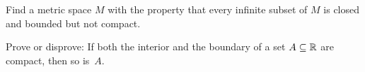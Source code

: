 \begin{prob}\label{cpt_prb4} Find a metric space $M$ with the property that every infinite subset
of $M$ is closed and bounded but not compact.
\end{prob}

\begin{prob} Prove or disprove: If both the interior and the boundary of a set $A \subseteq \mathbb{R}$ are
compact, then so is~$A$.
\end{prob}



\endinput
